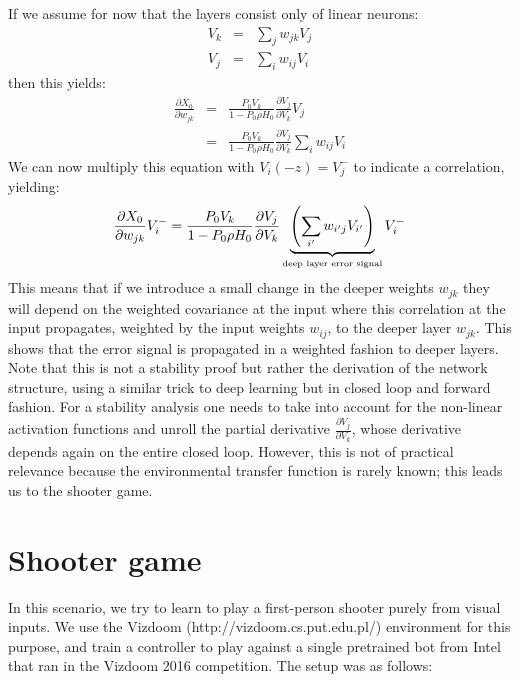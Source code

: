\documentclass{article}
\begin{document}
If we assume for now that the layers consist only of linear neurons:
\begin{eqnarray}
  V_k &=& \sum_j w_{jk} V_j \\
  V_j &=& \sum_i w_{ij} V_i
\end{eqnarray}
then this yields:
\begin{eqnarray}
    \frac{\partial X_0}{\partial w_{jk}} &=&
    \frac{P_0 V_k}{1-P_0 \rho H_0}
    \frac{\partial V_j}{\partial V_k}
    V_j \\
                                        &=&
    \frac{P_0 V_k}{1-P_0 \rho H_0}
    \frac{\partial V_j}{\partial V_k}
    \sum_i w_{ij} V_i
\end{eqnarray}    
  We can now multiply this equation with $V_i(-z)=V_j^-$ to indicate a correlation, yielding:
\begin{equation}
    \frac{\partial X_0}{\partial w_{jk}} V_i^- =   
    \frac{P_0 V_k}{1-P_0 \rho H_0}
    \frac{\partial V_j}{\partial V_k}
    \underbrace{\left( \sum_{i^\prime} w_{i^\prime j} V_{i^\prime} \right)}_\textrm{\tiny deep layer error signal} V_i^-
\end{equation}
This means that if we introduce a small change in the deeper weights
$w_{jk}$ they will depend on the weighted covariance at the input
where this correlation at the input propagates, weighted by the input
weights $w_{ij}$, to the deeper layer $w_{jk}$. This shows that the
error signal is propagated in a weighted fashion to deeper
layers. Note that this is not a stability proof but rather the
derivation of the network structure, using a similar trick to deep
learning but in closed loop and forward fashion. For a stability
analysis one needs to take into account for the non-linear activation
functions and unroll the partial derivative $\frac{\partial
  V_j}{\partial V_k}$, whose derivative depends again on the entire
closed loop. However, this is not of practical relevance because the
environmental transfer function is rarely known; this leads us to
the shooter game.
    
\section{Shooter game}
In this scenario, we try to learn to play a first-person shooter
purely from visual inputs. We use the Vizdoom
(http://vizdoom.cs.put.edu.pl/) environment for this purpose, and
train a controller to play against a single pretrained bot from Intel
that ran in the Vizdoom 2016 competition. The setup was as follows:
\end{document}

